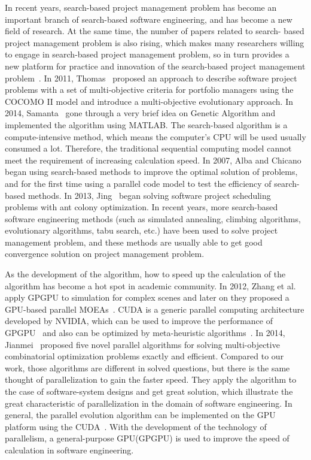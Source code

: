 In recent years, search-based project management problem has become an
important branch of search-based software engineering, and has become a new
field of research. At the same time, the number of papers related to search-
based project management problem is also rising, which makes many researchers
willing to engage in search-based project management problem, so in turn
provides a new platform for practice and innovation of the search-based
project management problem~\cite{penta}.
In 2011, Thomas~\cite{thomas} proposed an approach to describe software project problems
with a set of multi-objective criteria for portfolio managers using the COCOMO II model and
introduce a multi-objective evolutionary approach.
In 2014, Samanta~\cite{samanta} gone through a very brief idea on Genetic Algorithm and implemented the algorithm using MATLAB.
The search-based algorithm is a compute-intensive method, which means the
computer's CPU will be used usually consumed a lot. Therefore, the traditional
sequential computing model cannot meet the requirement of increasing calculation
speed. In 2007, Alba and Chicano~\cite{pospichal} began using search-based methods to improve the
optimal solution of problems, and for the first time using a parallel code model to test the efficiency of search-based methods.
In 2013, Jing~\cite{jing} began solving software project scheduling problems with ant colony optimization.
In recent years, more search-based software engineering methods (such as simulated
annealing, climbing algorithms, evolutionary algorithms, tabu search, etc.) have
been used to solve project management problem, and these methods are usually
able to get good convergence solution on project management problem.

As the development of the algorithm, how to speed up the calculation of the algorithm
has become a hot spot in academic community.
In 2012, Zhang et al.~\cite{zhang} apply GPGPU to
simulation for complex scenes and later on they proposed a GPU-based parallel MOEAs~\cite{li}.
CUDA is a generic parallel computing architecture developed by NVIDIA, which can be used to improve the performance of GPGPU~\cite{langdon2} and also can be optimized by meta-heuristic algorithms~\cite{langdon1,langdon3}.
In 2014, Jianmei~\cite{jianmei} proposed five novel parallel algorithms for solving 
multi-objective combinatorial optimization problems exactly and efficient.
Compared to our work, those algorithms are different in solved questions, but there is the same
thought of parallelization to gain the faster speed. They apply the algorithm to the case of
software-system designs and get great solution, which illustrate the great characteristic of
parallelization in the domain of software engineering.
In general, the parallel evolution algorithm can be implemented on the GPU platform using the CUDA~\cite{vidal}. With the development of the technology of parallelism, a general-purpose GPU(GPGPU) is used
to improve the speed of calculation in software engineering. 


